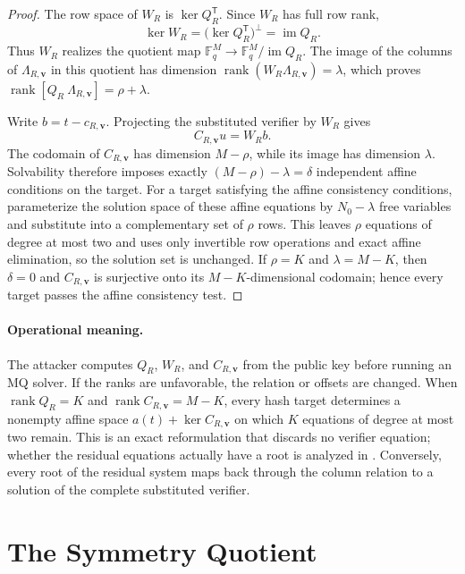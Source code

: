 \documentclass[11pt]{article}
\newcommand{\F}{\mathbb F}
\newcommand{\rank}{\operatorname{rank}}
\newcommand{\transpose}{\mathsf T}
\begin{document}
\begin{proof}
The row space of $W_R$ is $\ker Q_R^\transpose$.  Since $W_R$ has full row
rank,
\[
 \ker W_R=\bigl(\ker Q_R^\transpose\bigr)^\perp=\operatorname{im}Q_R.
\]
Thus $W_R$ realizes the quotient map
$\F_q^M\to\F_q^M/\operatorname{im}Q_R$.  The image of the columns of
$\Lambda_{R,\mathbf v}$ in this quotient has dimension
$\rank(W_R \Lambda_{R,\mathbf v})=\lambda$, which proves
$\rank[Q_R\ \Lambda_{R,\mathbf v}]=\rho+\lambda$.

Write $b=t-c_{R,\mathbf v}$.  Projecting the substituted verifier by $W_R$ gives
\[
 C_{R,\mathbf v}u=W_R b.
\]
The codomain of $C_{R,\mathbf v}$ has dimension $M-\rho$, while its image has
dimension $\lambda$.  Solvability therefore imposes exactly
$(M-\rho)-\lambda=\delta$ independent affine conditions on the target.
For a target satisfying the affine consistency conditions, parameterize the
solution space of these affine equations by $N_0-\lambda$ free variables and
substitute into a complementary set of $\rho$ rows.  This leaves $\rho$
equations of degree at most two and uses only invertible row operations and
exact affine elimination, so the solution set is unchanged.  If $\rho=K$ and
$\lambda=M-K$, then $\delta=0$ and $C_{R,\mathbf v}$ is surjective onto its
$M-K$-dimensional codomain; hence every target passes the affine consistency
test.
\end{proof}

\paragraph{Operational meaning.}
The attacker computes $Q_R$, $W_R$, and $C_{R,\mathbf v}$ from the public key before
running an MQ solver.  If the ranks are unfavorable, the relation or offsets
are changed.  When $\rank Q_R=K$ and $\rank C_{R,\mathbf v}=M-K$, every hash target determines a
nonempty affine space $a(t)+\ker C_{R,\mathbf v}$ on which $K$ equations of degree
at most two remain.  This is an exact reformulation that discards no verifier
equation; whether the residual equations actually have a root is analyzed in
.  Conversely, every root of the residual system maps back
through the column relation to a solution of the complete substituted verifier.

\section{The Symmetry Quotient}\label{sec:symmetry}
\end{document}
